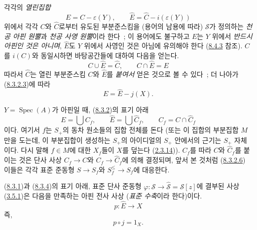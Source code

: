 \begin{env}[8.3.4]
\label{II.8.3.4-ko}
각각의 \emph{열린집합}
\begin{equation}
\label{II.8.3.4.1-ko}
  E=C-\varepsilon(Y),\qquad
  \widehat{E}=\widehat{C}-i(\varepsilon(Y))
\tag{8.3.4.1}
\end{equation}
위에서 각각 $C$와 $\widehat{C}$로부터 유도된 부분준스킴을 (용어의
남용에 따라) $\mathcal{S}$가 정의하는 \emph{천공 아핀 원뿔}과
\emph{천공 사영 원뿔}이라 한다~; 이 용어에도 불구하고 $E$는 $Y$
위에서 \emph{반드시 아핀인 것은 아니며}, $\widehat{E}$도 $Y$ 위에서
사영인 것은 아님에 유의해야 한다
(\hyperref[II.8.4.3-ko]{8.4.3} 참조). $C$를 $i(C)$와 동일시하면
바탕공간들에 대하여 다음을 얻는다.
\begin{equation}
\label{II.8.3.4.2-ko}
  C\cup\widehat{E}=\widehat{C},\qquad C\cap\widehat{E}=E
\tag{8.3.4.2}
\end{equation}
따라서 $\widehat{C}$는 열린 부분준스킴 $C$와 $\widehat{E}$를
\emph{붙여서} 얻은 것으로 볼 수 있다~; 더 나아가
(\hyperref[II.8.3.2.3-ko]{8.3.2.3})에 따라
\begin{equation}
\label{II.8.3.4.3-ko}
  E=\widehat{E}-j(X).
\tag{8.3.4.3}
\end{equation}

$Y=\operatorname{Spec}(A)$가 아핀일 때,
(\hyperref[II.8.3.2-ko]{8.3.2})의 표기 아래
\begin{equation}
\label{II.8.3.4.4-ko}
  E=\bigcup C_f,\qquad
  \widehat{E}=\bigcup\widehat{C}_f,\qquad
  C_f=C\cap\widehat{C}_f
\tag{8.3.4.4}
\end{equation}
이다. 여기서 $f$는 $S_+$의 동차 원소들의 집합 전체를 돈다 (또는 이
집합의 부분집합 $M$만을 도는데, 이 부분집합이 생성하는 $S_+$의 아이디얼의
$S_+$ 안에서의 근기는 $S_+$ 자체이다. 다시 말해 $f\in M$에 대한
$X_f$들이 $X$를 덮는다
(\hyperref[II.2.3.14-ko]{2.3.14})). $C_f$를 따라 $C$와
$\widehat{C}_f$를 붙이는 것은 단사 사상 $C_f\to C$와
$C_f\to\widehat{C}_f$에 의해 결정되며, 앞서 본 것처럼
(\hyperref[II.8.3.2.6-ko]{8.3.2.6}) 이들은 각각 표준 준동형
$S\to S_f$와 $S_f^{\leq}\to S_f$에 대응한다.
\end{env}

\begin{proposition}[8.3.5]
\label{II.8.3.5-ko}
(\hyperref[II.8.3.1-ko]{8.3.1})과
(\hyperref[II.8.3.4-ko]{8.3.4})의 표기 아래, 표준 단사 준동형
$\varphi:\mathcal{S}\to\widehat{\mathcal{S}}=\mathcal{S}[z]$에 결부된
사상 (\hyperref[II.3.5.1-ko]{3.5.1})은 다음을 만족하는 아핀 전사 사상
(\emph{표준 수축}이라 한다)이다.
\begin{equation}
\label{II.8.3.5.1-ko}
  p:\widehat{E}\to X
\tag{8.3.5.1}
\end{equation}
즉,
\begin{equation}
\label{II.8.3.5.2-ko}
  p\circ j=1_X.
\tag{8.3.5.2}
\end{equation}
\end{proposition}

